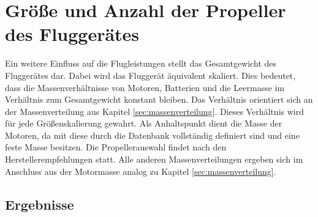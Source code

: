 \section{Größe und Anzahl der Propeller des Fluggerätes}
\label{sec:groesse}
Ein weitere Einfluss auf die Flugleistungen stellt das Gesamtgewicht des Fluggerätes dar. Dabei wird das Fluggerät äquivalent skaliert. Dies bedeutet, dass die Massenverhältnisse von Motoren, Batterien und die Leermasse im Verhältnis zum Gesamtgewicht konstant bleiben. Das Verhältnis orientiert sich an der Massenverteilung aus Kapitel \ref{sec:massenverteilung}. Dieses Verhältnis wird für jede Größenskalierung gewahrt. Als Anhaltspunkt dient die Masse der Motoren, da mit diese durch die Datenbank vollständig definiert sind und eine feste Masse besitzen. Die Propellerauswahl findet nach den Herstellerempfehlungen statt. Alle anderen Massenverteilungen ergeben sich im Anschluss aus der Motormasse analog zu Kapitel \ref{sec:massenverteilung}.

\subsection{Ergebnisse}
\label{subsec:ergebnisse_groesse}

